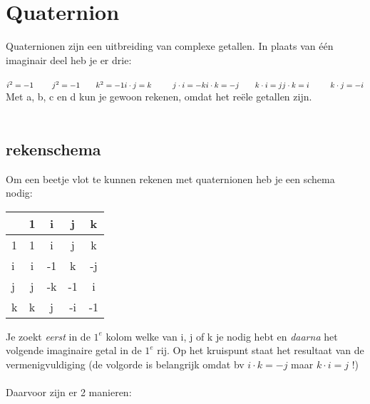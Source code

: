 \section{Quaternion}
Quaternionen zijn een uitbreiding van complexe getallen. In plaats van één imaginair deel heb je er drie:\\ \\
$ i^2 = -1 \qquad  \ j^2 = -1 \qquad k^2 = -1   \\
i\cdot j = k \qquad \ \ j\cdot i = -k \\
i\cdot k = -j \qquad k\cdot i = j \\
j\cdot k = i \qquad \ \ k\cdot j = -i \\ $
Met a, b, c en d kun je gewoon rekenen, omdat het reële getallen zijn.\\ \\
\subsection{rekenschema}
Om een beetje vlot te kunnen rekenen met quaternionen heb je een schema nodig:
\begin{center}
	\begin{tabular}{ | l || c | c |c |c |}
		\hline
		& 1 & i & j & k \\ \hline \hline
		1 & 1 & i & j & k \\ \hline
		i & i & -1 & k & -j\\ \hline
		j & j & -k & -1 & i\\ \hline
		k & k & j & -i & -1\\ 
		\hline 
	\end{tabular}
\end{center}

Je zoekt \textit{eerst} in de $ 1^e $ kolom welke van i, j of k je nodig hebt en \textit{daarna} het volgende  imaginaire getal in de $ 1^e $ rij.  Op het kruispunt staat het resultaat van de vermenigvuldiging (de volgorde is belangrijk omdat bv $  i\cdot k = -j $ maar $ k\cdot i = j  $ !) \\ \\
Daarvoor zijn er 2 manieren:\\

